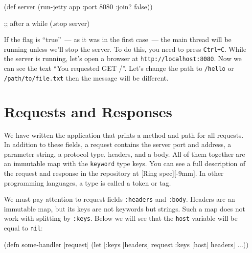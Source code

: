 \else

\begin{english}
  \begin{clojure}
(def server
  (run-jetty app {:port 8080 :join? false}))

;; after a while
(.stop server)
  \end{clojure}
\end{english}

\fi

If the flag is ``true''{}~--- as it was in the first case~--- the main thread will be running unless we'll stop the server. To do this, you need to press \verb|Ctrl+C|. While the server is running, let's open a browser at \verb|http://localhost:8080|. Now we can see the text ``You requested GET /''.  Let's change the path to \verb|/hello| or
\verb|/path/to/file.txt| then the message will be different.

\section{Requests and Responses}

We have written the application that prints a method and path for all requests. In addition to these fields, a request contains the server port and address, a parameter string, a protocol type, headers, and a body. All of them together are an immutable map with the \verb|keyword| type keys. You can see a full description of the request and response in the repository at [Ring spec][-9mm].
In other programming languages, a type is called a token or tag.


We must pay attention to request fields \verb|:headers| and \verb|:body|. Headers are an immutable map, but its keys are not keywords but strings. Such a map does not work with splitting by \verb|:keys|. Below we will see that the \verb|host| variable will be equal to \verb|nil|:


\begin{english}
  \begin{clojure}
(defn some-handler
  [request]
  (let [{:keys [headers]} request
        {:keys [host]} headers]
    ...))
  \end{clojure}
\end{english}


